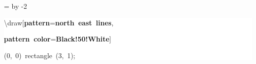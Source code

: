 \begingroup
\ttfamily
{}
=\textwidth
\advance{} by -2\fboxsep
\noindent
\colorbox{background}
{%
\parbox{\dimen255}
{%
\rule[-0.5ex]{0pt}{2.5ex}\hspace*{0.0em}\textbackslash{}draw[\textcolor{R}{\textbf{pattern}}=\textcolor{B}{\textbf{north~east~lines}},\\
\rule[-0.5ex]{0pt}{2.5ex}\hspace*{3.0em}\textcolor{R}{\textbf{pattern~color}}=\textcolor{B}{\textbf{Black!50!White}}]\\
\rule[-0.5ex]{0pt}{2.5ex}\hspace*{3.0em}(0,~0)~rectangle~(3,~1);}%
}%
\endgroup
